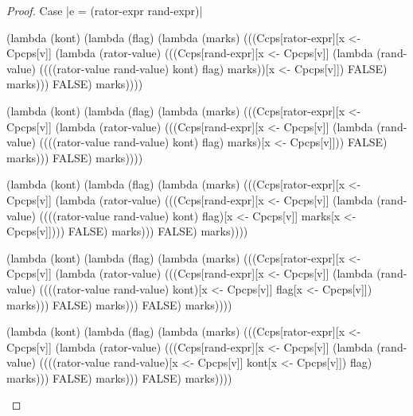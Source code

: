 \begin{proof}{Case \scheme|e = (rator-expr rand-expr)|}
\begin{schemeblock}
\begin{schemedisplay}
(lambda (kont)
   (lambda (flag)
     (lambda (marks)
       (((Ccps[rator-expr][x <- Cpcps[v]]
          (lambda (rator-value)
            (((Ccps[rand-expr][x <- Cpcps[v]]
               (lambda (rand-value)
                 ((((rator-value rand-value) kont) flag) marks))[x <- Cpcps[v]])
              FALSE) marks)))
         FALSE) marks))))
\end{schemedisplay}
\end{schemeblock}

\begin{schemeblock}
\begin{schemedisplay}
(lambda (kont)
   (lambda (flag)
     (lambda (marks)
       (((Ccps[rator-expr][x <- Cpcps[v]]
          (lambda (rator-value)
            (((Ccps[rand-expr][x <- Cpcps[v]]
               (lambda (rand-value)
                 ((((rator-value rand-value) kont) flag) marks)[x <- Cpcps[v]]))
              FALSE) marks)))
         FALSE) marks))))
\end{schemedisplay}
\end{schemeblock}

\begin{schemeblock}
\begin{schemedisplay}
(lambda (kont)
   (lambda (flag)
     (lambda (marks)
       (((Ccps[rator-expr][x <- Cpcps[v]]
          (lambda (rator-value)
            (((Ccps[rand-expr][x <- Cpcps[v]]
               (lambda (rand-value)
                 ((((rator-value rand-value) kont) flag)[x <- Cpcps[v]] marks[x <- Cpcps[v]])))
              FALSE) marks)))
         FALSE) marks))))
\end{schemedisplay}
\end{schemeblock}

\begin{schemeblock}
\begin{schemedisplay}
(lambda (kont)
   (lambda (flag)
     (lambda (marks)
       (((Ccps[rator-expr][x <- Cpcps[v]]
          (lambda (rator-value)
            (((Ccps[rand-expr][x <- Cpcps[v]]
               (lambda (rand-value)
                 ((((rator-value rand-value) kont)[x <- Cpcps[v]] flag[x <- Cpcps[v]]) marks)))
              FALSE) marks)))
         FALSE) marks))))
\end{schemedisplay}
\end{schemeblock}

\begin{schemeblock}
\begin{schemedisplay}
(lambda (kont)
   (lambda (flag)
     (lambda (marks)
       (((Ccps[rator-expr][x <- Cpcps[v]]
          (lambda (rator-value)
            (((Ccps[rand-expr][x <- Cpcps[v]]
               (lambda (rand-value)
                 ((((rator-value rand-value)[x <- Cpcps[v]] kont[x <- Cpcps[v]]) flag) marks)))
              FALSE) marks)))
         FALSE) marks))))
\end{schemedisplay}
\end{schemeblock}


\end{proof}
